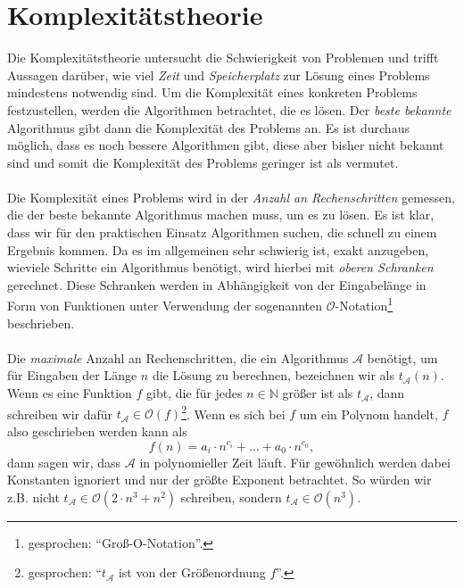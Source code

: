 \section{Komplexitätstheorie}\label{chp:complexity}
Die Komplexitätstheorie untersucht die Schwierigkeit von Problemen und trifft Aussagen darüber, wie viel \emph{Zeit} und \emph{Speicherplatz} zur Lösung eines Problems mindestens notwendig sind. Um die Komplexität eines konkreten Problems festzustellen, werden die Algorithmen betrachtet, die es lösen. Der \emph{beste bekannte} Algorithmus gibt dann die Komplexität des Problems an. Es ist durchaus möglich, dass es noch bessere Algorithmen gibt, diese aber bisher nicht bekannt sind und somit die Komplexität des Problems geringer ist als vermutet. \\
\\
Die Komplexität eines Problems wird in der \emph{Anzahl an Rechenschritten} gemessen, die der beste bekannte Algorithmus machen muss, um es zu lösen. Es ist klar, dass wir für den praktischen Einsatz Algorithmen suchen, die schnell zu einem Ergebnis kommen. Da es im allgemeinen sehr schwierig ist, exakt anzugeben, wieviele Schritte ein Algorithmus benötigt, wird hierbei mit \emph{oberen Schranken} gerechnet. Diese Schranken werden in Abhängigkeit von der Eingabelänge in Form von Funktionen unter Verwendung der sogenannten $\mathcal{O}$-Notation\footnote{gesprochen: ``Groß-O-Notation''.} beschrieben. \\
\\
Die \emph{maximale} Anzahl an Rechenschritten, die ein Algorithmus $\mathcal{A}$ benötigt, um für Eingaben der Länge $n$ die Lösung zu berechnen, bezeichnen wir als $t_\mathcal{A} \left( n \right)$. Wenn es eine Funktion $f$ gibt, die für jedes $n \in \mathbb{N}$ größer ist als $t_\mathcal{A}$, dann schreiben wir dafür $t_\mathcal{A} \in \mathcal{O} \left( f \right)$\footnote{gesprochen: ``$t_\mathcal{A}$ ist von der Größenordnung $f$''.}. Wenn es sich bei $f$ um ein Polynom handelt, $f$ also geschrieben werden kann als
\begin{equation}
f \left( n \right) = a_i \cdot n^{c_i} + \ldots + a_0 \cdot n^{c_0},
\end{equation}
dann sagen wir, dass $\mathcal{A}$ in polynomieller Zeit läuft. Für gewöhnlich werden dabei Konstanten ignoriert und nur der größte Exponent betrachtet. So würden wir z.B. nicht $t_\mathcal{A} \in \mathcal{O} \left( 2 \cdot n^3 + n^2 \right)$ schreiben, sondern $t_\mathcal{A} \in \mathcal{O} \left( n^3 \right)$. \\
